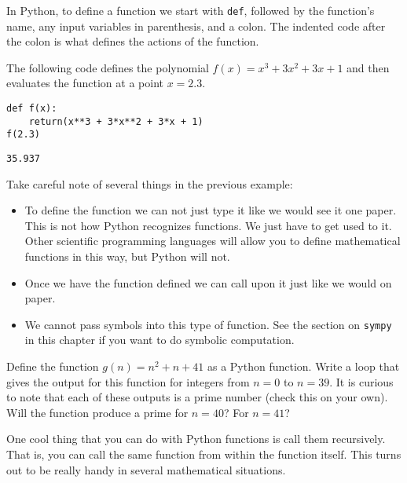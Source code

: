 In Python, to define a function we start with \texttt{def}, followed by the function's
name, any input variables in parenthesis, and a colon.  The indented code after the colon
is what defines the actions of the function.

\begin{example}
The following code defines the polynomial $f(x) = x^3 + 3x^2 + 3x + 1$ and then evaluates
the function at a point $x=2.3$.

\bcode
\begin{lstlisting}
def f(x):
    return(x**3 + 3*x**2 + 3*x + 1)
f(2.3)
\end{lstlisting}
\boutput
\begin{lstlisting}
35.937
\end{lstlisting}
\end{example}
Take careful note of several things in the previous example:
\begin{itemize}
    \item To define the function we can not just type it like we would see it one paper.
        This is not how Python recognizes functions.  We just have to get used to it.
        Other scientific programming languages will allow you to define mathematical
        functions in this way, but Python will not.
    \item Once we have the function defined we can call upon it just like we would on
        paper.
    \item We cannot pass symbols into this type of function.  See the section on
        \texttt{sympy} in this chapter if you want to do symbolic computation.
\end{itemize}


\begin{problem}
    Define the function $g(n) = n^2 + n + 41$ as a Python function.  Write a loop that
    gives the output for this function for integers from $n=0$ to $n=39$.  It is curious
    to note that each of these outputs is a prime number (check this on your own).  Will
    the function produce a prime for $n=40$? For $n=41$?  
\end{problem}

One cool thing that you can do with Python functions is call them recursively.  That is,
you can call the same function from within the function itself.  This turns out to be
really handy in several mathematical situations.

